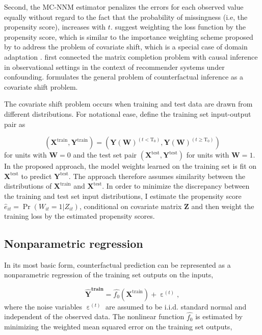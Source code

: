 Second, the MC-NNM estimator penalizes the errors for each observed value equally without regard to the fact that the probability of missingness (i.e, the propensity score), increases with $t$. \citet{athey2017matrix} suggest weighting the loss function by the propensity score, which is similar to the importance weighting scheme proposed by \citet{cortes2008sample} to address the problem of covariate shift, which is a special case of domain adaptation \citep{huang2007correcting,ben2007analysis,bickel2009discriminative,cortes2010learning,2015arXiv150507818G}. \citet{schnabel2016recommendations} first connected the matrix completion problem with causal inference in observational settings in the context of recommender systems under confounding. \citet{johansson2016learning} formulates the general problem of counterfactual inference as a covariate shift problem.

The covariate shift problem occurs when training and test data are drawn from different distributions. For notational ease, define the training set input-output pair as 

$$\left(\boldsymbol{X}^{\text{train}}, \boldsymbol{Y}^{\text{train}}\right) = \left(\boldsymbol{Y}(\boldsymbol{W})^{\left(t < \text{T}_0\right)}, \boldsymbol{Y}(\boldsymbol{W})^{\left(t \geq \text{T}_0\right)}\right)$$
\noindent
for units with $\boldsymbol{W}=0$ and the test set pair $\left(\boldsymbol{X}^{\text{test}}, \boldsymbol{Y}^{\text{test}}\right)$ for units with $\boldsymbol{W}=1$. In the proposed approach, the model weights learned on the training set is fit on $\boldsymbol{X}^{\text{test}}$ to predict $\boldsymbol{Y}^{\text{test}}$. The approach therefore assumes similarity between the distributions of $\boldsymbol{X}^{\text{train}}$ and $\boldsymbol{X}^{\text{test}}$. In order to minimize the discrepancy between the training and test set input distributions, I estimate the propensity score $\hat{e}_{it} = \Pr(W_{it}=1 | Z_{it})$, conditional on covariate matrix $\boldsymbol{Z}$ and then weight the training loss by the estimated propensity scores. 

\subsection{Nonparametric regression}

In its most basic form, counterfactual prediction can be represented as a nonparametric regression of the training set outputs on the inputs,

\begin{equation}\label{eq:np}
	\boldsymbol{\hat{\boldsymbol{Y}}^{\text{train}}} =  \hat{f_0} \left(\boldsymbol{X}^{\text{train}}\right) + \upepsilon^{(t)},
\end{equation}
\noindent
where the noise variables $\upepsilon^{(t)}$ are assumed to be i.i.d. standard normal and independent of the observed data. The nonlinear function $\hat{f_0}$ is estimated by minimizing the weighted mean squared error on the training set outputs, 

